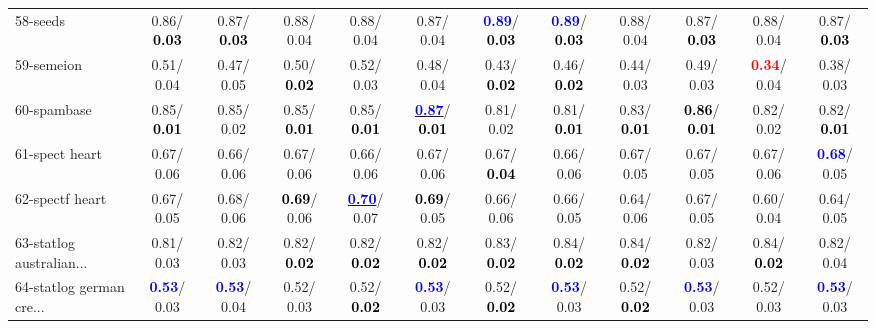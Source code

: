 \begin{table}[h]
\begin{center}
{\begin{tabular}{lc|c|c|c|c|c|c|c|c|c|c}
58-seeds &   0.86/\textcolor{black}{\textbf{  0.03}} &   0.87/\textcolor{black}{\textbf{  0.03}} &   0.88/  0.04 &   0.88/  0.04 &   0.87/  0.04 & \textcolor{blue}{\textbf{  0.89}}/\textcolor{black}{\textbf{  0.03}} & \textcolor{blue}{\textbf{  0.89}}/\textcolor{black}{\textbf{  0.03}} &   0.88/  0.04 &   0.87/\textcolor{black}{\textbf{  0.03}} &   0.88/  0.04 &   0.87/\textcolor{black}{\textbf{  0.03}} \\
59-semeion &   0.51/  0.04 &   0.47/  0.05 &   0.50/\textcolor{black}{\textbf{  0.02}} &   0.52/  0.03 &   0.48/  0.04 &   0.43/\textcolor{black}{\textbf{  0.02}} &   0.46/\textcolor{black}{\textbf{  0.02}} &   0.44/  0.03 &   0.49/  0.03 & \textcolor{red}{\textbf{  0.34}}/  0.04 &   0.38/  0.03 \\
60-spambase &   0.85/\textcolor{black}{\textbf{  0.01}} &   0.85/  0.02 &   0.85/\textcolor{black}{\textbf{  0.01}} &   0.85/\textcolor{black}{\textbf{  0.01}} & \underline{\textcolor{blue}{\textbf{  0.87}}}/\textcolor{black}{\textbf{  0.01}} &   0.81/  0.02 &   0.81/\textcolor{black}{\textbf{  0.01}} &   0.83/\textcolor{black}{\textbf{  0.01}} & \textcolor{black}{\textbf{  0.86}}/\textcolor{black}{\textbf{  0.01}} &   0.82/  0.02 &   0.82/\textcolor{black}{\textbf{  0.01}} \\ \hline
61-spect heart &   0.67/  0.06 &   0.66/  0.06 &   0.67/  0.06 &   0.66/  0.06 &   0.67/  0.06 &   0.67/\textcolor{black}{\textbf{  0.04}} &   0.66/  0.06 &   0.67/  0.05 &   0.67/  0.05 &   0.67/  0.06 & \textcolor{blue}{\textbf{  0.68}}/  0.05 \\
62-spectf heart &   0.67/  0.05 &   0.68/  0.06 & \textcolor{black}{\textbf{  0.69}}/  0.06 & \underline{\textcolor{blue}{\textbf{  0.70}}}/  0.07 & \textcolor{black}{\textbf{  0.69}}/  0.05 &   0.66/  0.06 &   0.66/  0.05 &   0.64/  0.06 &   0.67/  0.05 &   0.60/  0.04 &   0.64/  0.05 \\
63-statlog australian... &   0.81/  0.03 &   0.82/  0.03 &   0.82/\textcolor{black}{\textbf{  0.02}} &   0.82/\textcolor{black}{\textbf{  0.02}} &   0.82/\textcolor{black}{\textbf{  0.02}} &   0.83/\textcolor{black}{\textbf{  0.02}} &   0.84/\textcolor{black}{\textbf{  0.02}} &   0.84/\textcolor{black}{\textbf{  0.02}} &   0.82/  0.03 &   0.84/\textcolor{black}{\textbf{  0.02}} &   0.82/  0.04 \\
64-statlog german cre... & \textcolor{blue}{\textbf{  0.53}}/  0.03 & \textcolor{blue}{\textbf{  0.53}}/  0.04 &   0.52/  0.03 &   0.52/\textcolor{black}{\textbf{  0.02}} & \textcolor{blue}{\textbf{  0.53}}/  0.03 &   0.52/\textcolor{black}{\textbf{  0.02}} & \textcolor{blue}{\textbf{  0.53}}/  0.03 &   0.52/\textcolor{black}{\textbf{  0.02}} & \textcolor{blue}{\textbf{  0.53}}/  0.03 &   0.52/  0.03 & \textcolor{blue}{\textbf{  0.53}}/  0.03 \\\end{tabular}
}\label{strats1aNB}
\end{center}
\end{table}
